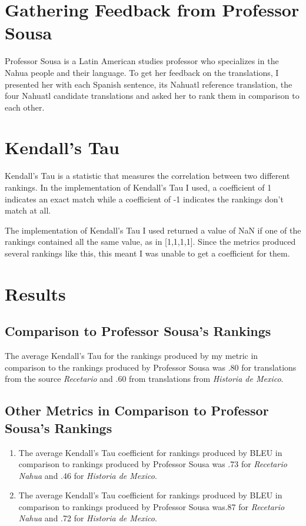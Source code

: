 \documentclass[10pt,twocolumn]{article}
\begin{document}
\section{Gathering Feedback from Professor Sousa}
Professor Sousa is a Latin American studies professor who specializes in the Nahua people and their language. To get her feedback on the translations, I presented her with each Spanish sentence, its Nahuatl reference translation, the four Nahuatl candidate translations and asked her to rank them in comparison to each other.


\section{Kendall's Tau}
Kendall's Tau is a statistic that measures the correlation between two different rankings. In the implementation of Kendall's Tau I used, a coefficient of 1 indicates an exact match while a coefficient of -1 indicates the rankings don't match at all. 

The implementation of Kendall's Tau I used returned a value of NaN if one of the rankings contained all the same value, as in [1,1,1,1]. Since the metrics produced several rankings like this, this meant I was unable to get a coefficient for them. 

\section{Results}

\subsection{Comparison to Professor Sousa's Rankings}

The average Kendall's Tau for the rankings produced by my metric in comparison to the rankings produced by Professor Sousa was .80 for translations from the source \textit{Recetario} and .60 from translations from \textit{Historia de Mexico}.

\subsection{Other Metrics in Comparison to Professor Sousa's Rankings}
\begin{enumerate}
    \item The average Kendall's Tau coefficient for rankings produced by BLEU in comparison to rankings produced by Professor Sousa was .73 for \textit{Recetario Nahua} and .46 for \textit{Historia de Mexico}.
    \item The average Kendall's Tau coefficient for rankings produced by BLEU in comparison to rankings produced by Professor Sousa was.87 for \textit{Recetario Nahua} and .72 for \textit{Historia de Mexico}.
\end{enumerate}
\end{document}
